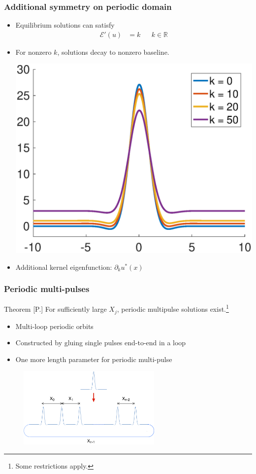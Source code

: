 \documentclass[16pt]{beamer}
\begin{document}
\begin{frame}
	\frametitle{Additional symmetry on periodic domain}

	\begin{itemize}
		\item Equilibrium solutions can satisfy
		\begin{align*}
		\mathcal{E}'(u) &= k && k \in \mathbb{R}
		\end{align*}
		\item For nonzero $k$, solutions decay to nonzero baseline.
		\begin{center}
			\includegraphics[width=0.5\linewidth]{images/periodick.eps}
		\end{center}
		\item Additional kernel eigenfunction: $\partial_k u^*(x)$
	\end{itemize}
\end{frame}

\begin{frame}
\frametitle{Periodic multi-pulses} 
    \begin{block}{Theorem [P.]}
    For sufficiently large $X_j$, periodic multipulse solutions exist.\footnote{Some restrictions apply.}
    \begin{itemize}
    	\item Multi-loop periodic orbits
		\item Constructed by gluing single pulses end-to-end in a loop
		\item One more length parameter for periodic multi-pulse
    \end{itemize}

	\begin{figure}
	\begin{center}
	\includegraphics[width=7cm]{images/multipulseperiodic.png}
	\end{center}
	\end{figure}
    \end{block}
\end{frame}
\end{document}
